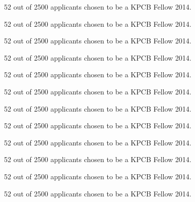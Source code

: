 \documentclass[]{deedy-resume-openfont}
\begin{document}
\begin{tightemize}
\item 52 out of 2500 applicants chosen to be a KPCB Fellow 2014.
\item 52 out of 2500 applicants chosen to be a KPCB Fellow 2014.
\item 52 out of 2500 applicants chosen to be a KPCB Fellow 2014.
\end{tightemize}

\sectionsep

\vspace{\topsep}

\begin{tightemize}
\item 52 out of 2500 applicants chosen to be a KPCB Fellow 2014.
\item 52 out of 2500 applicants chosen to be a KPCB Fellow 2014.
\item 52 out of 2500 applicants chosen to be a KPCB Fellow 2014.
\end{tightemize}

\begin{tightemize}
\item 52 out of 2500 applicants chosen to be a KPCB Fellow 2014.
\item 52 out of 2500 applicants chosen to be a KPCB Fellow 2014.
\item 52 out of 2500 applicants chosen to be a KPCB Fellow 2014.
\end{tightemize}

\begin{tightemize}
\item 52 out of 2500 applicants chosen to be a KPCB Fellow 2014.
\item 52 out of 2500 applicants chosen to be a KPCB Fellow 2014.
\item 52 out of 2500 applicants chosen to be a KPCB Fellow 2014.
\end{tightemize}

\end{document}
